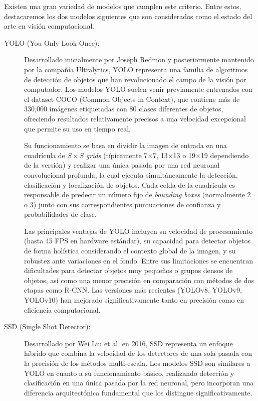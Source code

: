 Existen una gran variedad de modelos que cumplen este criterio. Entre estos, destacaremos los dos modelos siguientes que son considerados como el estado del arte en visión computacional.

\begin{description}
	\item[YOLO (You Only Look Once):] Desarrollado inicialmente por Joseph Redmon y posteriormente mantenido por la compañía Ultralytics, YOLO representa una familia de algoritmos de detección de objetos que han revolucionado el campo de la visión por computador. Los modelos YOLO suelen venir previamente entrenados con el dataset COCO (Common Objects in Context), que contiene más de 330,000 imágenes etiquetadas con 80 clases diferentes de objetos, ofreciendo resultados relativamente precisos a una velocidad excepcional que permite su uso en tiempo real.
	
	Su funcionamiento se basa en dividir la imagen de entrada en una cuadrícula de $S \times S$ \textit{grids} (típicamente 7×7, 13×13 o 19×19 dependiendo de la versión) y realizar una única pasada por una red neuronal convolucional profunda, la cual ejecuta simultáneamente la detección, clasificación y localización de objetos. Cada celda de la cuadrícula es responsable de predecir un número fijo de \textit{bounding boxes} (normalmente 2 o 3) junto con sus correspondientes puntuaciones de confianza y probabilidades de clase.
	
	Las principales ventajas de YOLO incluyen su velocidad de procesamiento (hasta 45 FPS en hardware estándar), su capacidad para detectar objetos de forma holística considerando el contexto global de la imagen, y su robustez ante variaciones en el fondo. Entre sus limitaciones se encuentran dificultades para detectar objetos muy pequeños o grupos densos de objetos, así como una menor precisión en comparación con métodos de dos etapas como R-CNN. Las versiones más recientes (YOLOv8, YOLOv9, YOLOv10) han mejorado significativamente tanto en precisión como en eficiencia computacional.

	\item[SSD (Single Shot Detector):] Desarrollado por Wei Liu et al. en 2016, SSD representa un enfoque híbrido que combina la velocidad de los detectores de una sola pasada con la precisión de los métodos multi-escala. Los modelos SSD son similares a YOLO en cuanto a su funcionamiento básico, realizando detección y clasificación en una única pasada por la red neuronal, pero incorporan una diferencia arquitectónica fundamental que los distingue significativamente.
	

\end{description}
